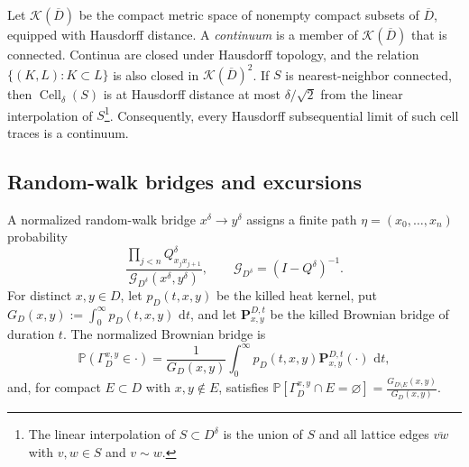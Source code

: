 \documentclass[11pt]{article}
\numberwithin{equation}{section}
\newcommand{\1}{\mathbf{1}}
\newcommand\ol[1]{\overline{#1}}
\newcommand{\Prob}{\mathbb P}
\newcommand{\dd}{\,\mathrm d}
\newcommand{\Gc}{\mathcal G}
\newcommand{\Cell}{\operatorname{Cell}}
\begin{document}
Let \(\mathcal K(\ol D)\) be the compact metric space of nonempty compact
subsets of \(\ol D\), equipped with Hausdorff distance.  A
\emph{continuum} is a member of \(\mathcal K(\ol D)\) that is connected. Continua are closed under Hausdorff topology, and the relation \(\{(K,L):K\subset L\}\) is also closed in
\(\mathcal K(\ol D)^2\).
If \(S\) is nearest-neighbor connected, then \(\Cell_\delta(S)\) is at Hausdorff distance at most $\delta/\sqrt{2}$ from the linear interpolation of $S$\footnote{The linear interpolation of $S\subset D^\delta$ is the union of $S$ and all lattice edges $\ol{vw}$ with $v,w\in S$ and $v\sim w$.}. Consequently, every Hausdorff subsequential limit of such cell traces is a continuum.  

\subsection{Random-walk bridges and excursions}
\label{subsec:continuum-paths}

A normalized random-walk bridge \(x^\delta\to y^\delta\) assigns a finite
path \(\eta=(x_0,\ldots,x_n)\) probability
\[
 \frac{\prod_{j<n}Q^\delta_{x_jx_{j+1}}}
      {\Gc_{D^\delta}(x^\delta,y^\delta)},
\qquad \Gc_{D^\delta}=(I-Q^\delta)^{-1}.
\]
For distinct \(x,y\in D\), let \(p_D(t,x,y)\) be the killed heat kernel,
put \(G_D(x,y):=\int_0^\infty p_D(t,x,y)\,\dd t\), and let
\(\mathbf P_{x,y}^{D,t}\) be the killed Brownian bridge of duration \(t\).
The normalized Brownian bridge is
\begin{equation}\label{eq:green-bridge-definition}
 \Prob(\Gamma_D^{x,y}\in\cdot)
 =\frac1{G_D(x,y)}\int_0^\infty
 p_D(t,x,y)\mathbf P_{x,y}^{D,t}(\cdot)\,\dd t,
\end{equation}
and, for compact \(E\subset D\) with \(x,y\notin E\), satisfies $\Prob[\Gamma_D^{x,y}\cap E=\varnothing]=\frac{G_{D\setminus E}(x,y)}{G_D(x,y)}$.
 
\end{document}
